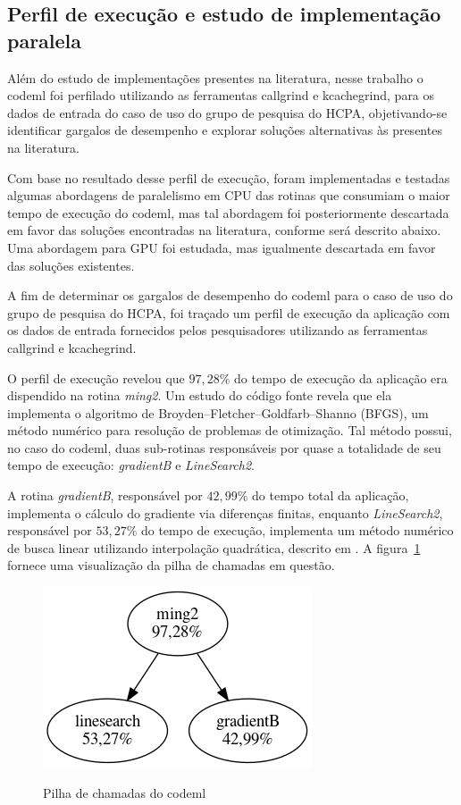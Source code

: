 \documentclass[cic,tc]{iiufrgs}
\begin{document}
\subsection{Perfil de execução e estudo de implementação paralela}
\label{subsec:codemlpar}

Além do estudo de implementações presentes na literatura, nesse trabalho o
codeml foi perfilado utilizando as ferramentas callgrind e
kcachegrind,\cite{weidendorfer2008sequential} para os dados de entrada do caso
de uso do grupo de pesquisa do HCPA, objetivando-se identificar gargalos de
desempenho e explorar soluções alternativas às presentes na literatura.

Com base no resultado desse perfil de execução, foram implementadas e testadas
algumas abordagens de paralelismo em CPU das rotinas que consumiam o maior
tempo de execução do codeml, mas tal abordagem foi posteriormente descartada em
favor das soluções encontradas na literatura, conforme será descrito abaixo.
Uma abordagem para GPU foi estudada, mas igualmente descartada em favor das
soluções existentes.

A fim de determinar os gargalos de desempenho do codeml para o caso de uso do
grupo de pesquisa do HCPA, foi traçado um perfil de execução da aplicação com
os dados de entrada fornecidos pelos pesquisadores utilizando as
ferramentas callgrind e kcachegrind.\cite{weidendorfer2008sequential}

O perfil de execução revelou que $97,28\%$ do tempo de execução da aplicação
era dispendido na rotina \textit{ming2}. Um estudo do código fonte revela que
ela implementa o algoritmo de Broyden–Fletcher–Goldfarb–Shanno (BFGS), um
método numérico para resolução de problemas de otimização. Tal método possui,
no caso do codeml, duas sub-rotinas responsáveis por quase a totalidade de seu
tempo de execução: \textit{gradientB} e \textit{LineSearch2}.

A rotina \textit{gradientB}, responsável por $42,99\%$ do tempo total da
aplicação, implementa o cálculo do gradiente via diferenças finitas, enquanto
\textit{LineSearch2}, responsável por $53,27\%$ do tempo de execução,
implementa um método numérico de busca linear utilizando interpolação
quadrática, descrito em \cite{wolfe1978numerical}. A
figura~\ref{fig:kcachegrind} fornece uma visualização da pilha de chamadas em
questão.

\begin{figure} \caption{Pilha de chamadas do codeml} \begin{center}
\includegraphics[width=0.3\linewidth]{img/kcachegrind.png} \end{center}
 \label{fig:kcachegrind} \end{figure}
\end{document}
